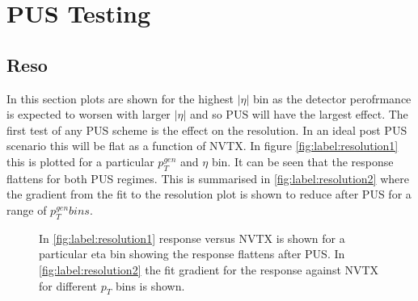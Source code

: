 \section{PUS Testing}
\subsection{Reso}
In this section plots are shown for the highest $|\eta|$ bin as the detector perofrmance is expected to worsen with larger $|\eta|$ and so PUS will have the largest effect. The first test of any PUS scheme is the effect on the resolution. In an ideal post PUS scenario this will be flat as a function of NVTX. In figure \ref{fig:label:resolution1} this is plotted for a particular $p^{gen}_T$ and $\eta$ bin. It can be seen that the response flattens for both PUS regimes. This is summarised in \ref{fig:label:resolution2} where the gradient from the fit to the resolution plot is shown to reduce after PUS for a range of $p^{gen}_T bins$.  
\begin{figure}
\hfill
{}
\hfill
{}
\caption{In \ref{fig:label:resolution1} response versus NVTX is shown for a particular eta bin showing the response flattens after PUS. In \ref{fig:label:resolution2} the fit gradient for the response against NVTX for different $p_{T}$ bins is shown.}
\label{fig:label:resolution}
\end{figure}
